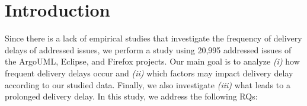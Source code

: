 \section{Introduction}


Since there is a lack of empirical studies that investigate the frequency of
delivery delays of addressed issues, we perform a study using 20,995 addressed
issues of the ArgoUML, Eclipse, and Firefox projects. Our main goal is to
analyze {\em (i)} how frequent delivery delays occur and {\em (ii)} which
factors may impact delivery delay according to our studied data. Finally, we
also investigate {\em (iii)} what leads to a prolonged delivery delay. In this study, we
address the following RQs:


